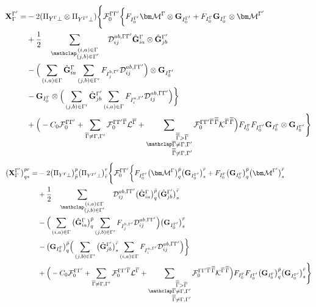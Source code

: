 \documentclass[a4paper,11pt]{article}
\begin{document}
\begin{equation}
  \begin{split}
    \mathbf{X}_\irp^\irpP = &
    -2 (\Pi_{Y^\irp \perp} \otimes \Pi_{Y^\irpP \perp})
    \Bigg\{ \mathcal{F}_0^{\irp\irpP}
    \bigg\{
    F_{I_0^\irpP} \matM^\irp \otimes \matG_{I_0^\irpP}
    + F_{I_0^\irp} \matG_{I_0^\irp} \otimes \matM^\irpP\\
    & + \frac{1}{2} \sumijabmix \Dmix_{ij}^{ab, \irp\irpP}
      \hat{\matG}_{ia}^\irp \otimes \hat{\matG}_{jb}^\irpP\\
    & - \Big(
        \sum_{(i,a)\in\irp} \hat{\matG}_{ia}^\irp
        \sum_{(j,b)\in\irpP} F_{I_j^{b,\irpP}} \Dmix_{ij}^{ab, \irp\irpP}
    \Big) \otimes \matG_{I_0^\irpP}\\
    & - \matG_{I_0^\irp} \otimes \Big(
        \sum_{(j,b)\in\irpP} \hat{\matG}_{jb}^\irpP
        \sum_{(i,a)\in\irp} F_{I_i^{a,\irpP}} \Dmix_{ij}^{ab, \irp\irpP}
    \Big)
    \bigg\}\\
    & + 
    \Big(
        -C_0 \mathcal{F}_0^{\irp\irpP}
        + \sumBp \mathcal{F}_0^{\irp\irpP\irpB} \mathcal{L}^\irpB
        + \sumBBp \mathcal{F}_0^{\irp\irpP\irpB\,\irpBB} \mathcal{K}^{\irpB\,\irpBB}
    \Big)
    F_{I_0^\irp} F_{I_0^\irpP} \matG_{I_0^\irp} \otimes \matG_{I_0^\irpP}
    \Bigg\}
  \end{split}
\end{equation}
\begin{equation}
  \begin{split}
    \big( \mathbf{X}_\irp^\irpP \big)^{pr}_{qs} = &
    -2 \big( \Pi_{Y^\irp \perp} \big)^p_{\bar{p}} \big( \Pi_{Y^\irpP \perp} \big)^r_{\bar{r}}
    \Bigg\{ \mathcal{F}_0^{\irp\irpP}
    \bigg\{
    F_{I_0^\irpP} \big( \matM^\irp \big)^{\bar{p}}_q \big( \matG_{I_0^\irpP} \big)^{\bar{r}}_s
    + F_{I_0^\irp} \big( \matG_{I_0^\irp} \big)^{\bar{p}}_q \big( \matM^\irpP \big)^{\bar{r}}_s\\
    & + \frac{1}{2} \sumijabmix \Dmix_{ij}^{ab, \irp\irpP}
      \big( \hat{\matG}_{ia}^\irp \big)^{\bar{p}}_q \big( \hat{\matG}_{jb}^\irpP \big)^{\bar{r}}_s\\
    & - \Big(
        \sum_{(i,a)\in\irp} \big( \hat{\matG}_{ia}^\irp \big)^{\bar{p}}_q
        \sum_{(j,b)\in\irpP} F_{I_j^{b,\irpP}} \Dmix_{ij}^{ab, \irp\irpP}
    \Big) \big( \matG_{I_0^\irpP} \big)^{\bar{r}}_s\\
    & - \big( \matG_{I_0^\irp} \big)^{\bar{p}}_q \Big(
        \sum_{(j,b)\in\irpP} \big( \hat{\matG}_{jb}^\irpP \big)^{\bar{r}}_s
        \sum_{(i,a)\in\irp} F_{I_i^{a,\irpP}} \Dmix_{ij}^{ab, \irp\irpP}
    \Big)
    \bigg\}\\
    & + 
    \Big(
        -C_0 \mathcal{F}_0^{\irp\irpP}
        + \sumBp \mathcal{F}_0^{\irp\irpP\irpB} \mathcal{L}^\irpB
        + \sumBBp \mathcal{F}_0^{\irp\irpP\irpB\,\irpBB} \mathcal{K}^{\irpB\,\irpBB}
    \Big)
    F_{I_0^\irp} F_{I_0^\irpP}
    \big( \matG_{I_0^\irp} \big)^{\bar{p}}_{q} \big( \matG_{I_0^\irpP} \big)^{\bar{r}}_s
    \Bigg\}
  \end{split}
\end{equation}
\end{document}
